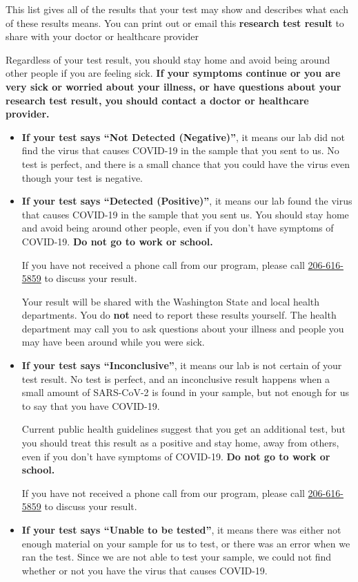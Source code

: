 \documentclass[10pt]{article}
\begin{document}
This list gives all of the results that your test may show and describes what
each of these results means. You can print out or email this \textbf{research
test result} to share with your doctor or healthcare provider

Regardless of your test result, you should stay home and avoid being around
other people if you are feeling sick. \textbf{If your symptoms continue or you are
very sick or worried about your illness, or have questions about your research
test result, you should contact a doctor or healthcare provider.}

\begin{itemize}


\item

  \textbf{If your test says ``Not Detected (Negative)''}, it means our lab did not find the
  virus that causes COVID-19 in the sample that you sent to us. No test is
  perfect, and there is a small chance that you could have the virus even though
  your test is negative.

\item

  \textbf{If your test says ``Detected (Positive)''}, it means our
  lab found the virus that causes COVID-19 in the sample that you sent us. You
  should stay home and avoid being around other people, even if you don’t have
  symptoms of COVID-19. \textbf{Do not go to work or school.}

  If you have not received a phone call from our program, please call
  \href{tel:+1-206-616-5859}{206-616-5859} to discuss your result.

  Your result will be shared with the Washington State and local health
  departments. You do \textbf{not} need to report these results yourself. The
  health department may call you to ask questions about your illness and people
  you may have been around while you were sick.

\item

  \textbf{If your test says ``Inconclusive''}, it means our lab is not certain
  of your test result. No test is perfect, and an inconclusive result happens
  when a small amount of SARS-CoV-2 is found in your sample, but not enough for
  us to say that you have COVID-19.

  Current public health guidelines suggest that you get an additional test, but
  you should treat this result as a positive and stay home, away from others,
  even if you don’t have symptoms of COVID-19. \textbf{Do not go to work or
  school.}

  If you have not received a phone call from our program, please call
  \href{tel:+1-206-616-5859}{206-616-5859} to discuss your result.

\item

  \textbf{If your test says ``Unable to be tested''}, it means there was either
  not enough material on your sample for us to test, or there was an error when
  we ran the test. Since we are not able to test your sample, we could not find
  whether or not you have the virus that causes COVID-19.

\end{itemize}
\end{document}
